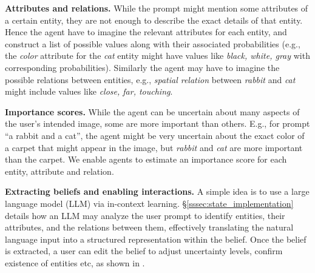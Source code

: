 \textbf{Attributes and relations.\;} While the prompt might mention some attributes of a certain entity, they are not enough to describe the exact details of that entity. Hence the agent have to imagine the relevant attributes for each entity, and construct a list of possible values along with their associated probabilities (e.g., the \textit{color} attribute for the \textit{cat} entity might have values like \textit{black, white, gray} with corresponding probabilities). Similarly the agent may have to imagine the possible relations between entities, e.g., \textit{spatial relation} between \textit{rabbit} and \textit{cat} might include values like \textit{close, far, touching}.


\textbf{Importance scores.\;} While the agent can be uncertain about many aspects of the user's intended image, some are more important than others. %
E.g., for prompt ``a rabbit and a cat'', the agent might be very uncertain about the exact color of a carpet that might appear in the image, but \textit{rabbit} and \textit{cat} are more important than the carpet. We enable agents to estimate an importance score for each entity, attribute and relation. %


\textbf{Extracting beliefs and enabling interactions.\;} A simple idea is to use a large language model (LLM) via in-context learning. \S\ref{sssec:state_implementation} details how an LLM may analyze the user prompt to identify entities, their attributes, and the relations between them, effectively translating the natural language input into a structured representation within the belief. Once the belief is extracted, a user can edit the belief to adjust uncertainty levels, confirm existence of entities etc, as shown in .





















\vspace{-.5em}
